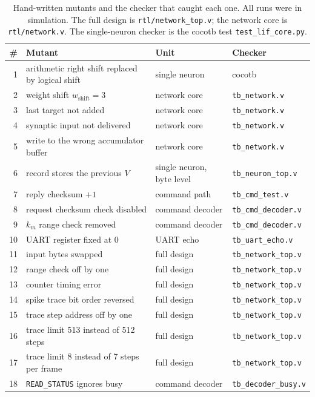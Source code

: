 \documentclass[11pt]{article}
\begin{document}
\begin{table}[t]
\centering
\caption{Hand-written mutants and the checker that caught each one. All runs were in simulation. The full design is \texttt{rtl/network\_top.v}; the network core is \texttt{rtl/network.v}. The single-neuron checker is the cocotb test \texttt{test\_lif\_core.py}.}
\label{tab:mut}
{\small\begin{tabular}{rlll}
\toprule
\# & Mutant & Unit & Checker \\
\midrule
1 & arithmetic right shift replaced by logical shift & single neuron & cocotb \\
2 & weight shift $w_{\mathrm{shift}}=3$ & network core & \texttt{tb\_network.v} \\
3 & last target not added & network core & \texttt{tb\_network.v} \\
4 & synaptic input not delivered & network core & \texttt{tb\_network.v} \\
5 & write to the wrong accumulator buffer & network core & \texttt{tb\_network.v} \\
6 & record stores the previous $V$ & single neuron, byte level & \texttt{tb\_neuron\_top.v} \\
7 & reply checksum $+1$ & command path & \texttt{tb\_cmd\_test.v} \\
8 & request checksum check disabled & command decoder & \texttt{tb\_cmd\_decoder.v} \\
9 & $k_m$ range check removed & command decoder & \texttt{tb\_cmd\_decoder.v} \\
10 & UART register fixed at 0 & UART echo & \texttt{tb\_uart\_echo.v} \\
11 & input bytes swapped & full design & \texttt{tb\_network\_top.v} \\
12 & range check off by one & full design & \texttt{tb\_network\_top.v} \\
13 & counter timing error & full design & \texttt{tb\_network\_top.v} \\
14 & spike trace bit order reversed & full design & \texttt{tb\_network\_top.v} \\
15 & trace step address off by one & full design & \texttt{tb\_network\_top.v} \\
16 & trace limit 513 instead of 512 steps & full design & \texttt{tb\_network\_top.v} \\
17 & trace limit 8 instead of 7 steps per frame & full design & \texttt{tb\_network\_top.v} \\
18 & \texttt{READ\_STATUS} ignores busy & command decoder & \texttt{tb\_decoder\_busy.v} \\
\bottomrule
\end{tabular}}
\end{table}
\end{document}

